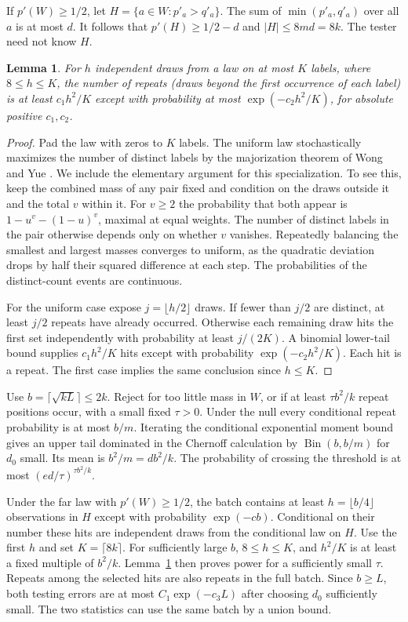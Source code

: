 \documentclass[11pt]{article}
\newtheorem{lemma}[theorem]{Lemma}
\newcommand{\Bin}{\operatorname{Bin}}
\begin{document}
If \(p'(W)\ge1/2\), let \(H=\{a\in W:p'_a>q'_a\}\). The sum of \(\min(p'_a,q'_a)\) over all \(a\) is at most \(d\). It follows that \(p'(H)\ge1/2-d\) and \(|H|\le8md=8k\). The tester need not know \(H\).

\begin{lemma}\label{lem:repeat}
For \(h\) independent draws from a law on at most \(K\) labels, where \(8\le h\le K\), the number of repeats (draws beyond the first occurrence of each label) is at least \(c_1 h^2/K\) except with probability at most \(\exp(-c_2 h^2/K)\), for absolute positive \(c_1,c_2\).
\end{lemma}
\begin{proof}
Pad the law with zeros to \(K\) labels. The uniform law stochastically maximizes the number of distinct labels by the majorization theorem of Wong and Yue \cite{wong}. We include the elementary argument for this specialization. To see this, keep the combined mass of any pair fixed and condition on the draws outside it and the total \(v\) within it. For \(v\ge2\) the probability that both appear is \(1-u^v-(1-u)^v\), maximal at equal weights. The number of distinct labels in the pair otherwise depends only on whether \(v\) vanishes. Repeatedly balancing the smallest and largest masses converges to uniform, as the quadratic deviation drops by half their squared difference at each step. The probabilities of the distinct-count events are continuous.

For the uniform case expose \(j=\lfloor h/2\rfloor\) draws. If fewer than \(j/2\) are distinct, at least \(j/2\) repeats have already occurred. Otherwise each remaining draw hits the first set independently with probability at least \(j/(2K)\). A binomial lower-tail bound supplies \(c_1 h^2/K\) hits except with probability \(\exp(-c_2 h^2/K)\). Each hit is a repeat. The first case implies the same conclusion since \(h\le K\).
\end{proof}

Use \(b=\lceil\sqrt{kL}\rceil\le2k\). Reject for too little mass in \(W\), or if at least \(\tau b^2/k\) repeat positions occur, with a small fixed \(\tau>0\). Under the null every conditional repeat probability is at most \(b/m\). Iterating the conditional exponential moment bound gives an upper tail dominated in the Chernoff calculation by \(\Bin(b,b/m)\) for \(d_0\) small. Its mean is \(b^2/m=d b^2/k\). The probability of crossing the threshold is at most \((ed/\tau)^{\tau b^2/k}\).

Under the far law with \(p'(W)\ge1/2\), the batch contains at least \(h=\lfloor b/4\rfloor\) observations in \(H\) except with probability \(\exp(-c b)\). Conditional on their number these hits are independent draws from the conditional law on \(H\). Use the first \(h\) and set \(K=\lceil8k\rceil\). For sufficiently large \(b\), \(8\le h\le K\), and \(h^2/K\) is at least a fixed multiple of \(b^2/k\). Lemma~\ref{lem:repeat} then proves power for a sufficiently small \(\tau\). Repeats among the selected hits are also repeats in the full batch. Since \(b\ge L\), both testing errors are at most \(C_1\exp(-c_3 L)\) after choosing \(d_0\) sufficiently small. The two statistics can use the same batch by a union bound.
\end{document}
